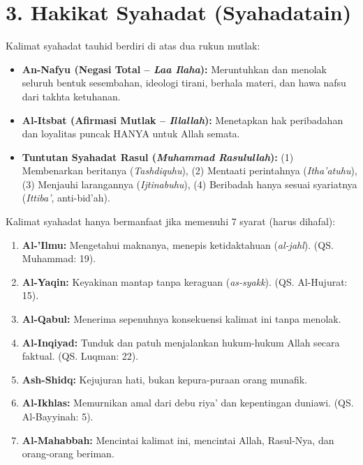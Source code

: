 \documentclass[10pt,a4paper]{article}
\begin{document}
\section*{\color{ugmblue}\Large 3. Hakikat Syahadat (Syahadatain)}

\begin{conceptbox}
Kalimat syahadat tauhid berdiri di atas dua rukun mutlak:
\begin{itemize}
  \item \textbf{An-Nafyu (Negasi Total -- \textit{Laa Ilaha}):} Meruntuhkan dan menolak seluruh bentuk sesembahan, ideologi tirani, berhala materi, dan hawa nafsu dari takhta ketuhanan.
  \item \textbf{Al-Itsbat (Afirmasi Mutlak -- \textit{Illallah}):} Menetapkan hak peribadahan dan loyalitas puncak HANYA untuk Allah semata.
  \item \textbf{Tuntutan Syahadat Rasul (\textit{Muhammad Rasulullah}):} (1) Membenarkan beritanya (\textit{Tashdiquhu}), (2) Mentaati perintahnya (\textit{Itha'atuhu}), (3) Menjauhi larangannya (\textit{Ijtinabuhu}), (4) Beribadah hanya sesuai syariatnya (\textit{Ittiba'}, anti-bid'ah).
\end{itemize}
\end{conceptbox}

\begin{conceptbox}
Kalimat syahadat hanya bermanfaat jika memenuhi 7 syarat (harus dihafal):
\begin{enumerate}
  \item \textbf{Al-'Ilmu:} Mengetahui maknanya, menepis ketidaktahuan (\textit{al-jahl}). (QS. Muhammad: 19).
  \item \textbf{Al-Yaqin:} Keyakinan mantap tanpa keraguan (\textit{as-syakk}). (QS. Al-Hujurat: 15).
  \item \textbf{Al-Qabul:} Menerima sepenuhnya konsekuensi kalimat ini tanpa menolak.
  \item \textbf{Al-Inqiyad:} Tunduk dan patuh menjalankan hukum-hukum Allah secara faktual. (QS. Luqman: 22).
  \item \textbf{Ash-Shidq:} Kejujuran hati, bukan kepura-puraan orang munafik.
  \item \textbf{Al-Ikhlas:} Memurnikan amal dari debu riya' dan kepentingan duniawi. (QS. Al-Bayyinah: 5).
  \item \textbf{Al-Mahabbah:} Mencintai kalimat ini, mencintai Allah, Rasul-Nya, dan orang-orang beriman.
\end{enumerate}
\end{conceptbox}
\end{document}
